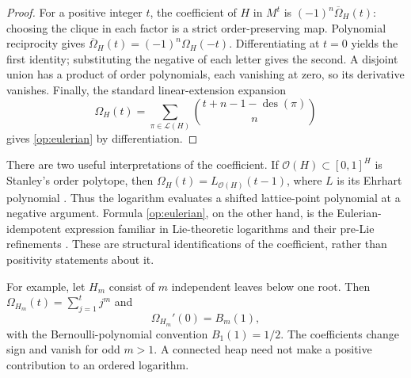 \begin{proof}
For a positive integer $t$, the coefficient of $H$ in $M^t$ is
$(-1)^n\overline\Omega_H(t)$: choosing the clique in each factor is a strict
order-preserving map. Polynomial reciprocity gives
$\overline\Omega_H(t)=(-1)^n\Omega_H(-t)$. Differentiating at $t=0$ yields
the first identity; substituting the negative of each letter gives the
second. A disjoint union has a product of order polynomials, each vanishing
at zero, so its derivative vanishes. Finally, the standard linear-extension
expansion
\[
 \Omega_H(t)=\sum_{\pi\in\mathcal L(H)}
 \binom{t+n-1-\operatorname{des}(\pi)}n
\]
gives \eqref{op:eulerian} by differentiation.
\end{proof}

There are two useful interpretations of the coefficient. If
$\mathcal O(H)\subset[0,1]^H$ is Stanley's order polytope, then
$\Omega_H(t)=L_{\mathcal O(H)}(t-1)$, where $L$ is its Ehrhart polynomial
\citep{Stanley1986}. Thus the logarithm evaluates a shifted lattice-point
polynomial at a negative argument. Formula \eqref{op:eulerian}, on the other
hand, is the Eulerian-idempotent expression familiar in Lie-theoretic
logarithms and their pre-Lie refinements \citep{BandieraSchaetz2017}. These
are structural identifications of the coefficient, rather than positivity
statements about it.

For example, let $H_m$ consist of $m$ independent leaves below one root.
Then $\Omega_{H_m}(t)=\sum_{j=1}^tj^m$ and
\begin{equation}
 \Omega_{H_m}'(0)=B_m(1),
 \label{op:bernoulli}
\end{equation}
with the Bernoulli-polynomial convention $B_1(1)=1/2$. The coefficients
change sign and vanish for odd $m>1$. A connected heap need not make a
positive contribution to an ordered logarithm.


